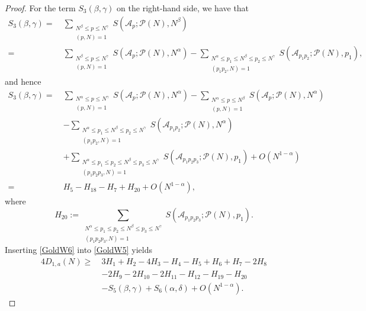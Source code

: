 \documentclass[12pt, a4paper]{amsart}
\def\leq{\leqslant}
\def\le{\leqslant}
\def\ge{\geqslant}
\theoremstyle{plain}
\theoremstyle{remark}
\numberwithin{equation}{section}
\begin{document}
\begin{proof}
For the term $S_3(\beta,\gamma)$ on the right-hand side, 
we have that 
\begin{equation*}
\begin{split}
S_3(\beta,\gamma)=\ &\sum_{\substack{N^\beta \le p \le N^\gamma \\ (p, N) = 1}} S(\mathscr{A}_p; \mathscr{P}(N), N^\beta)\\
=\ & \sum_{\substack{N^\beta \le p \le N^\gamma \\ (p, N) = 1}} S(\mathscr{A}_p; \mathscr{P}(N), N^\alpha)-\sum_{\substack{N^{\alpha} \leq p_1 \le N^{\beta} \le p_2 \le N^{\gamma} \\ (p_1 p_2, N) = 1}} S(\mathscr{A}_{p_1 p_2}; \mathscr{P}(N), p_1), 
\end{split}
\end{equation*}
and hence 
\begin{equation}\label{GoldW6}
\begin{split}
S_3(\beta,\gamma)
=\ & \sum_{\substack{N^\alpha \le p \le N^\gamma \\ (p, N) = 1}} S(\mathscr{A}_p; \mathscr{P}(N), N^\alpha)-\sum_{\substack{N^\alpha \le p \le N^\beta \\ (p, N) = 1}} S(\mathscr{A}_p; \mathscr{P}(N), N^\alpha)\\
		&-\sum_{\substack{N^{\alpha} \leq p_1 \le N^{\beta} \le p_2 \le N^{\gamma} \\ (p_1 p_2, N) = 1}} S(\mathscr{A}_{p_1 p_2}; \mathscr{P}(N), N^{\alpha})\\
		&+\sum_{\substack{N^{\alpha} \leq p_1 \le p_2 \le N^{\beta} \leq p_3 \le N^{\gamma}\\ (p_1 p_2 p_3, N) = 1}} S(\mathscr{A}_{p_1 p_2 p_3}; \mathscr{P}(N), p_1)+O(N^{1-\alpha})\\
		=\ &H_5-H_{18}-H_{7}+H_{20}+O(N^{1-\alpha}),
\end{split}
\end{equation}
where
\begin{equation}
H_{20}:=\sum_{\substack{N^{\alpha} \leq p_1 \le p_2 \le N^{\beta} \leq p_3 \le N^{\gamma}\\ (p_1 p_2 p_3, N) = 1}} 
S(\mathscr{A}_{p_1 p_2 p_3}; \mathscr{P}(N), p_1). 
\end{equation}
Inserting \eqref{GoldW6} into \eqref{GoldW5} yields 
\begin{equation}\label{GoldW7}
\begin{split}
4D_{1,a}(N)
\ge\ & 3H_1+H_2-4H_3-H_4-H_5+H_6+H_7 -2H_8\\ 
& -2H_9-2H_{10}-2H_{11} -H_{12}-H_{19}-H_{20} \\ 
& -S_5(\beta,\gamma)+S_6(\alpha,\delta)+O(N^{1-\alpha}).
\end{split}
\end{equation}


\end{proof}
\end{document}
